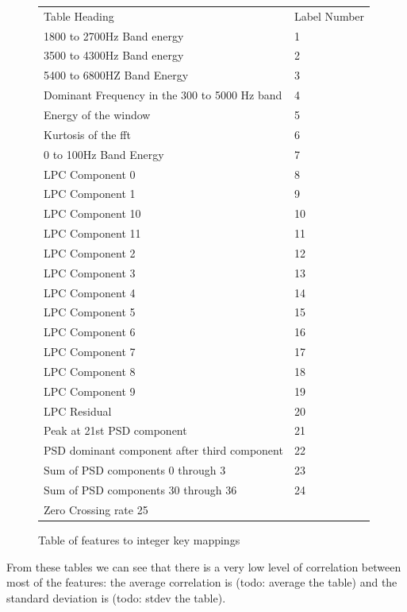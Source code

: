\documentclass[ %
                    author={Sam Phippen},
                supervisor={Dr. Rafal Bogacz},
                     title={Real time voice activity detectors in noisy personal computing environments},
                  subtitle={},
                    degree={MEng},
                      year={2012} ]{thesis}
\begin{document}
\begin{figure}
    \begin{tabular}{ |l|l| }
        Table Heading & Label Number \\
        1800 to 2700Hz Band energy & 1 \\
        3500 to 4300Hz Band energy & 2 \\
        5400 to 6800HZ Band Energy & 3 \\
        Dominant Frequency in the 300 to 5000 Hz band & 4 \\
        Energy of the window & 5 \\
        Kurtosis of the fft & 6 \\
        0 to 100Hz Band Energy & 7 \\
        LPC Component 0 & 8 \\
        LPC Component 1 & 9 \\
        LPC Component 10 & 10 \\
        LPC Component 11 & 11 \\
        LPC Component 2 & 12 \\
        LPC Component 3 & 13 \\
        LPC Component 4 & 14 \\
        LPC Component 5 & 15 \\
        LPC Component 6 & 16 \\
        LPC Component 7 & 17 \\
        LPC Component 8 & 18 \\
        LPC Component 9 & 19 \\
        LPC Residual & 20 \\
        Peak at 21st PSD component & 21 \\
        PSD dominant component after third component & 22 \\
        Sum of PSD components 0 through 3 & 23 \\
        Sum of PSD components 30 through 36 & 24 \\
        Zero Crossing rate 25 & \\
    \end{tabular}
    \caption{Table of features to integer key mappings}
    \label{fig:feature-keys}
\end{figure}

From these tables we can see that there is a very low level of correlation
between most of the features: the average correlation is (todo: average the
table) and the standard deviation is (todo: stdev the table).
\end{document}
